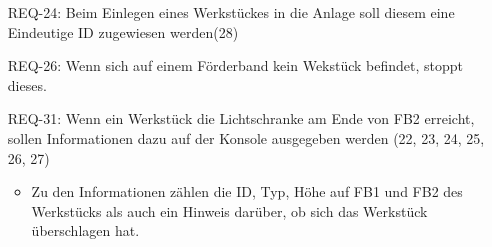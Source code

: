 \begin{itemize}
    \item[REQ-24:] Beim Einlegen eines Werkstückes in die Anlage soll diesem eine Eindeutige ID zugewiesen werden(28)
    \item[REQ-26:] Wenn sich auf einem Förderband kein Wekstück befindet, stoppt dieses.
    \item[REQ-31:] Wenn ein Werkstück die Lichtschranke am Ende von FB2 erreicht,
    sollen Informationen dazu auf der Konsole ausgegeben werden (22, 23, 24, 25, 26, 27)
    \begin{itemize}
        \item Zu den Informationen zählen die ID, Typ, Höhe auf FB1 und FB2 des Werkstücks als
        auch ein Hinweis darüber, ob sich das Werkstück überschlagen hat.
    \end{itemize}
\end{itemize}

